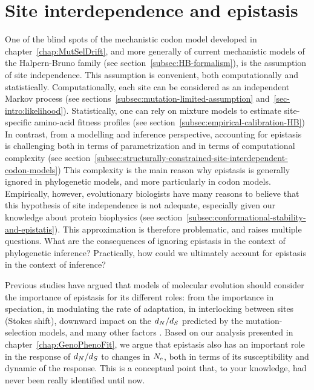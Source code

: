 \section{Site interdependence and epistasis}
\label{sec:epistasis-and-entrenchment}

One of the blind spots of the mechanistic codon model developed in chapter~\ref{chap:MutSelDrift}, and more generally of current mechanistic models of the Halpern-Bruno family (see section~\ref{subsec:HB-formalism}), is the assumption of site independence.
This assumption is convenient, both computationally and statistically.
Computationally, each site can be considered as an independent Markov process (see sections~\ref{subsec:mutation-limited-assumption} and~\ref{sec-intro:likelihood}).
Statistically, one can rely on mixture models to estimate site-specific amino-acid fitness profiles (see section~\ref{subsec:empirical-calibration-HB})
In contrast, from a modelling and inference perspective, accounting for epistasis is challenging both in terms of parametrization and in terms of computational complexity (see section~\ref{subsec:structurally-constrained-site-interdependent-codon-models})
This complexity is the main reason why epistasis is generally ignored in phylogenetic models, and more particularly in codon models.
Empirically, however, evolutionary biologists have many reasons to believe that this hypothesis of site independence is not adequate, especially given our knowledge about protein biophysics (see section~\ref{subsec:conformational-stability-and-epistatis}).
This approximation is therefore problematic, and raises multiple questions.
What are the consequences of ignoring epistasis in the context of phylogenetic inference?
Practically, how could we ultimately account for epistasis in the context of inference?

Previous studies have argued that models of molecular evolution should consider the importance of epistasis for its different roles: from the importance in speciation, in modulating the rate of adaptation, in interlocking between sites (Stokes shift), downward impact on the $d_N / d_S$ predicted by the mutation-selection models, and many other factors \citet{Goldstein2017, Miller2018}.
Based on our analysis presented in chapter~\ref{chap:GenoPhenoFit}, we argue that epistasis also has an important role in the response of $d_N / d_S$ to changes in $N_{\text{e}}$, both in terms of its susceptibility and dynamic of the response.
This is a conceptual point that, to your knowledge, had never been really identified until now.

